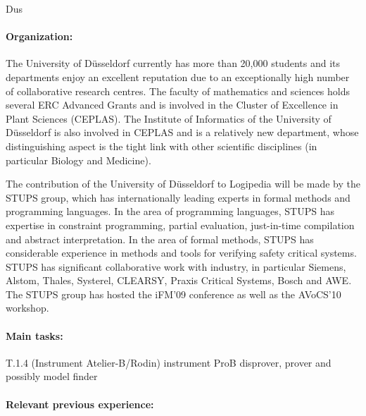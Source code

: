 \begin{sitedescription}{Dus}

\paragraph{Organization:}

The University of D\"usseldorf currently has more than 20,000 students and its departments enjoy an excellent reputation due to an exceptionally high number of collaborative research centres.
The faculty of mathematics and sciences holds several ERC Advanced Grants and is involved in the Cluster of Excellence in Plant Sciences (CEPLAS).
The Institute of Informatics of the University of D\"usseldorf is also involved in CEPLAS and is a relatively new department, whose distinguishing aspect is the tight link with other scientific disciplines (in particular Biology and Medicine).

The contribution of the University of D\"usseldorf to Logipedia will be made by the STUPS group, 
which has internationally leading experts in formal methods and programming languages.
In the area of programming languages, STUPS has expertise in constraint programming,
 partial evaluation, just-in-time compilation and abstract interpretation.
In the area of formal methods, STUPS has considerable experience in methods and
 tools for verifying safety critical systems.
STUPS has significant collaborative work with industry,
in particular Siemens, Alstom, Thales, Systerel, CLEARSY, Praxis Critical Systems, Bosch  and AWE.
The STUPS group has hosted the iFM'09 conference as well as the AVoCS'10 workshop.



\paragraph{Main tasks:}

\begin{compactitem}
\item{} 
\item T.1.4 (Instrument Atelier-B/Rodin) instrument ProB disprover, prover and possibly model finder
\end{compactitem}


\paragraph{Relevant previous experience:}


\end{sitedescription}
